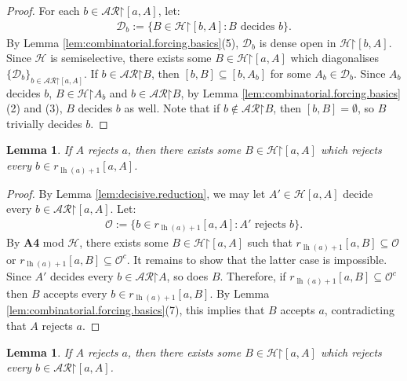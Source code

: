 \documentclass[10pt,a4paper]{amsart}
\theoremstyle{plain}
\numberwithin{equation}{section}
\newtheorem{lemma}[theorem]{Lemma}
\theoremstyle{definition}
\newcommand{\func}{\operatorname}
\newcommand{\cal}{\mathcal}
\newcommand{\restrictedto}{\mathord{\upharpoonright}}
\renewcommand{\H}{\cal{H}}
\newcommand{\lh}{\func{lh}}
\renewcommand{\O}{\cal{O}}
\newcommand{\D}{\cal{D}}
\begin{document}
\begin{proof}
     For each $b \in \cal{AR}\restrictedto[a,A]$, let:
     \begin{align*}
        \D_b := \{B \in \H\restrictedto[b,A] : B \text{ decides } b\}.
     \end{align*}
     By Lemma \ref{lem:combinatorial.forcing.basics}(5), $\D_b$ is dense open in $\H\restrictedto[b,A]$. Since $\H$ is semiselective, there exists some $B \in \H\restrictedto[a,A]$ which diagonalises $\{\D_b\}_{b\in\cal{AR}\restrictedto[a,A]}$. If $b \in \cal{AR}\restrictedto B$, then $[b,B] \subseteq [b,A_b]$ for some $A_b \in \D_b$. Since $A_b$ decides $b$, $B \in \H\restrictedto A_b$ and $b \in \cal{AR}\restrictedto B$, by Lemma \ref{lem:combinatorial.forcing.basics}(2) and (3), $B$ decides $b$ as well. Note that if $b \notin \cal{AR}\restrictedto B$, then $[b,B] = \emptyset$, so $B$ trivially decides $b$.
\end{proof}

\begin{lemma}
\label{lem:one-point.reject.reduction}
    If $A$ rejects $a$, then there exists some $B \in \H\restrictedto[a,A]$ which rejects every $b \in r_{\lh(a)+1}[a,A]$.
\end{lemma}

\begin{proof}
    By Lemma \ref{lem:decisive.reduction}, we may let $A' \in \H[a,A]$ decide every $b \in \cal{AR}\restrictedto[a,A]$. Let:
    \begin{align*}
        \O := \{b \in r_{\lh(a)+1}[a,A] : A' \text{ rejects } b\}.
    \end{align*}
    By \textbf{A4} mod $\H$, there exists some $B \in \H\restrictedto[a,A]$ such that $r_{\lh(a)+1}[a,B] \subseteq \O$ or $r_{\lh(a)+1}[a,B] \subseteq \O^c$. It remains to show that the latter case is impossible. Since $A'$ decides every $b \in \cal{AR}\restrictedto A$, so does $B$. Therefore, if $r_{\lh(a)+1}[a,B] \subseteq \O^c$ then $B$ accepts every $b \in r_{\lh(a)+1}[a,B]$. By Lemma \ref{lem:combinatorial.forcing.basics}(7), this implies that $B$ accepts $a$, contradicting that $A$ rejects $a$.
\end{proof}

\begin{lemma}
\label{lem:completely.reject.reduction}
    If $A$ rejects $a$, then there exists some $B \in \H\restrictedto[a,A]$ which rejects every $b \in \cal{AR}\restrictedto[a,A]$. 
\end{lemma}
\end{document}
